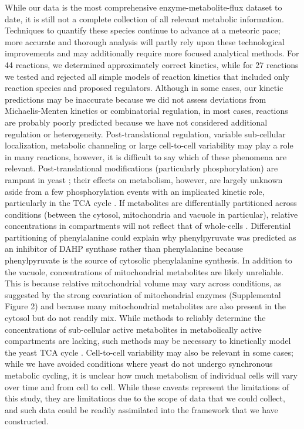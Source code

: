 While our data is the most comprehensive enzyme-metabolite-flux dataset to date, it is still not a complete collection of all relevant metabolic information. Techniques to quantify these species continue to advance at a meteoric pace; more accurate and thorough analysis will partly rely upon these technological improvements and may additionally require more focused analytical methods. For 44 reactions, we determined approximately correct kinetics, while for 27 reactions we tested and rejected all simple models of reaction kinetics that included only reaction species and proposed regulators.  Although in some cases, our kinetic predictions may be inaccurate because we did not assess deviations from Michaelis-Menten kinetics or combinatorial regulation, in most cases, reactions are probably poorly predicted because we have not considered additional regulation or heterogeneity.  Post-translational regulation, variable sub-cellular localization, metabolic channeling or large cell-to-cell variability may play a role in many reactions, however, it is difficult to say which of these phenomena are relevant.  Post-translational modifications (particularly phosphorylation) are rampant in yeast \cite{Fiedler:2009hx}; their effects on metabolism, however, are largely unknown aside from a few phosphorylation events with an implicated kinetic role, particularly in the TCA cycle \cite{Schulz:2014eo}. If metabolites are differentially partitioned across conditions (between the cytosol, mitochondria and vacuole in particular), relative concentrations in compartments will not reflect that of whole-cells \cite{Kitamoto:1988wc}. Differential partitioning of phenylalanine could explain why phenylpyruvate was predicted as an inhibitor of DAHP synthase rather than phenylalanine because phenylpyruvate is the source of cytosolic phenylalanine synthesis.  In addition to the vacuole, concentrations of mitochondrial metabolites are likely unreliable. This is  because relative mitochondrial volume may vary across conditions, as suggested by the strong covariation of mitochondrial enzymes (Supplemental Figure 2) and because many mitochondrial metabolites are also present in the cytosol but do not readily mix.  While methods to reliably determine the concentrations of sub-cellular active metabolites in metabolically active compartments are lacking, such methods may be necessary to kinetically model the yeast TCA cycle \cite{Schulz:2014eo}.  Cell-to-cell variability may also be relevant in some cases; while we have avoided conditions where yeast do not undergo synchronous metabolic cycling, it is unclear how much metabolism of individual cells will vary over time and from cell to cell. While these caveats represent the limitations of this study, they are limitations due to the scope of data that we could collect, and such data could be readily assimilated into the framework that we have constructed.  

